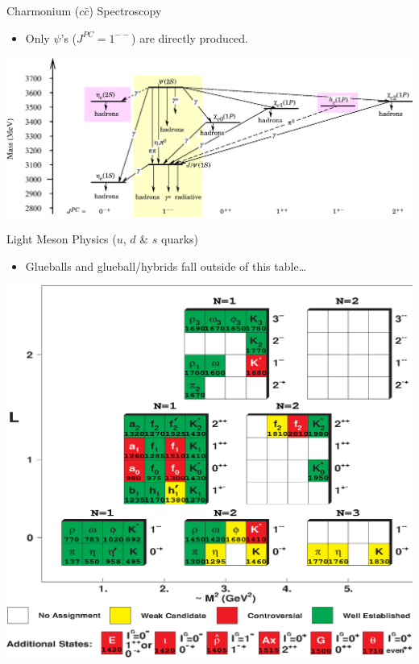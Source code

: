 \begin{slide*}
\slideframe{}
\begin{minipage}[t]{\linewidth}
\Large

\vspace{0.1 cm}

{\huge Charmonium ($c\bar{c}$) Spectroscopy}
\vspace{-0.3 cm}
\begin{itemize}
  \item Only $\psi$'s ($J^{PC}=1^{--}$) are directly produced.
\end{itemize}
\begin{center}
  \includegraphics[width=0.75\linewidth]{pdg_charmonium2.eps}
\end{center}

\vspace{0.1 cm}

{\huge Light Meson Physics ($u$, $d$ \& $s$ quarks)}
\vspace{-0.3 cm}
\begin{itemize}
  \item Glueballs and glueball/hybrids fall outside of this table\ldots
\end{itemize}
\begin{center}
  \includegraphics*[width=0.65\linewidth]{periodic_table.eps}
\end{center}

\end{minipage}
\end{slide*}


